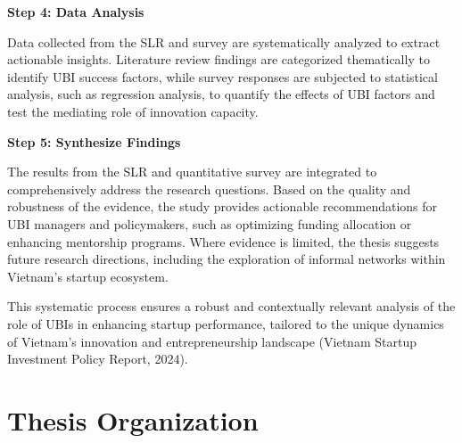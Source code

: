 \documentclass[../Main.tex]{subfiles}
\begin{document}
	\begin{center}
		\begin{minipage}[c]{\textwidth}
		\vspace*{\fill}

	\textbf{Step 4: Data Analysis}

	Data collected from the SLR and survey are systematically analyzed to extract actionable insights. Literature review findings are categorized thematically to identify UBI success factors, while survey responses are subjected to statistical analysis, such as regression analysis, to quantify the effects of UBI factors and test the mediating role of innovation capacity.

	\textbf{Step 5: Synthesize Findings}

	The results from the SLR and quantitative survey are integrated to comprehensively address the research questions. Based on the quality and robustness of the evidence, the study provides actionable recommendations for UBI managers and policymakers, such as optimizing funding allocation or enhancing mentorship programs. Where evidence is limited, the thesis suggests future research directions, including the exploration of informal networks within Vietnam's startup ecosystem.

	This systematic process ensures a robust and contextually relevant analysis of the role of UBIs in enhancing startup performance, tailored to the unique dynamics of Vietnam's innovation and entrepreneurship landscape (Vietnam Startup Investment Policy Report, 2024).

		\end{minipage}
	\end{center}

	\section{Thesis Organization}
	\label{section:1.4_Thesis_organization} 
\end{document}
